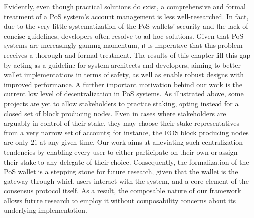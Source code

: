Evidently, even though practical solutions do exist, a comprehensive and formal
treatment of a PoS system's account management is less well-researched. In
fact, due to the very little systematization of the PoS wallets' security and
the lack of concise guidelines, developers often resolve to ad hoc solutions.
Given that PoS systems are increasingly gaining momentum, it is imperative that
this problem receives a thorough and formal treatment. The results of this
chapter fill this gap by acting as a guideline for system architects and
developers, aiming to better wallet implementations in terms of safety, as well
as enable robust designs with improved performance.  A further important
motivation behind our work is the current low level of decentralization in PoS
systems. As illustrated above, some projects are yet to allow stakeholders to
practice staking, opting instead for a closed set of block producing nodes.
Even in cases where stakeholders are arguably in control of their stake, they
may choose their stake representatives from a very narrow set of accounts; for
instance, the EOS block producing nodes are only $21$ at any given time. Our
work aims at alleviating such centralization tendencies by enabling every user
to either participate on their own or assign their stake to any delegate of
their choice.  Consequently, the formalization of the PoS wallet is a stepping
stone for future research, given that the wallet is the gateway through which
users interact with the system, and a core element of the consensus protocol
itself.  As a result, the composable nature of our framework allows future
research to employ it without composability concerns about its underlying
implementation.
